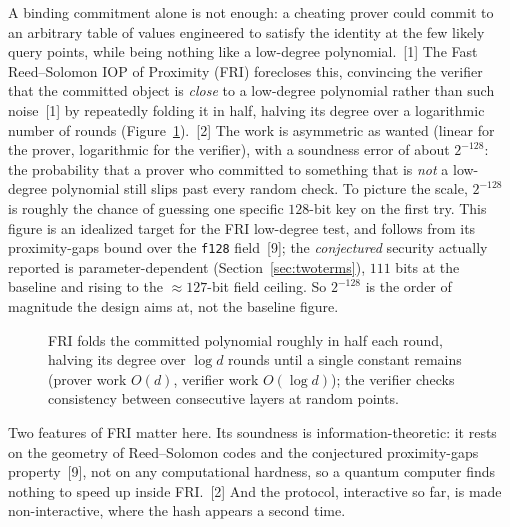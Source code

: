 \documentclass[11pt]{article}
\begin{document}
A binding commitment alone is not enough: a cheating prover could commit to an arbitrary table of values
engineered to satisfy the identity at the few likely query points, while being nothing like a low-degree
polynomial.~[1] The Fast Reed--Solomon IOP of Proximity (FRI) forecloses this, convincing the verifier
that the committed object is \emph{close} to a low-degree polynomial rather than such noise~[1] by
repeatedly folding it in half, halving its degree over a logarithmic number of rounds
(Figure~\ref{fig:fri}).~[2] The work is asymmetric as wanted (linear for the prover, logarithmic for
the verifier), with a soundness error of about $2^{-128}$: the probability that a prover who committed to
something that is \emph{not} a low-degree polynomial still slips past every random check. To picture the
scale, $2^{-128}$ is roughly the chance of guessing one specific $128$-bit key on the first try. This
figure is an idealized target for the FRI low-degree test, and follows from its proximity-gaps bound over
the \texttt{f128} field~[9]; the \emph{conjectured} security actually reported is parameter-dependent
(Section~\ref{sec:twoterms}), $111$ bits at the baseline and rising to the ${\approx}127$-bit field
ceiling. So $2^{-128}$ is the order of magnitude the design aims at, not the baseline figure.

\begin{figure}[htbp]\centering
{}
\caption{FRI folds the committed polynomial roughly in half each round, halving its degree over $\log d$
rounds until a single constant remains (prover work $O(d)$, verifier work $O(\log d)$); the verifier
checks consistency between consecutive layers at random points.}
\label{fig:fri}
\end{figure}

Two features of FRI matter here. Its soundness is information-theoretic: it rests on the geometry of
Reed--Solomon codes and the conjectured proximity-gaps property~[9], not on any computational hardness,
so a quantum computer finds nothing to speed up inside FRI.~[2] And the protocol, interactive so far, is
made non-interactive, where the hash appears a second time.
\end{document}
